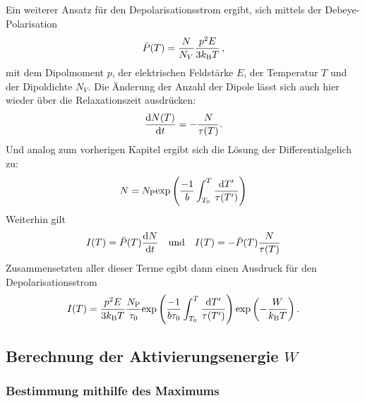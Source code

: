 		Ein weiterer Ansatz für den Depolarisationsstrom ergibt, sich mittels der Debeye-Polarisation
		\begin{equation}
			\bar{P}(T) = \frac{N}{N_V}\frac{p^2E}{3k_{\text{B}}T} \, ,
		\end{equation}	
		mit dem Dipolmoment $p$, der elektrischen Feldstärke $E$, der Temperatur $T$ und der Dipoldichte $N_V$.
		Die Änderung der Anzahl der Dipole lässt sich auch hier wieder über die Relaxationszeit ausdrücken:
		\begin{equation}
			\frac{\text{d} N(T)}{\text{d} t} =- \frac{N}{\tau(T)}.
		\end{equation}
		Und analog zum vorherigen Kapitel ergibt sich die Lösung der Differentialgelich zu:
		\begin{equation}
			N = N_{\text{P}} \text{exp}\left( \frac{-1}{b}\int_{T_0}^T \frac{\text{d}T'}{\tau(T')}\right)
		\end{equation}
		Weiterhin gilt
		\begin{align}
			I(T) = \bar{P}(T)\frac{\text{d} N}{\text{d} t}& &\text{und} & & I(T) = -\bar{P}(T) \frac{N}{\tau(T)}
		\end{align}
		Zusammensetzten aller dieser Terme egibt dann einen Ausdruck für den Depolarisationsstrom
		\begin{equation}
			I(T) =\frac{p^2E}{3k_{\text{B}}T}\frac{N_{\text{P}}}{\tau_0}\text{exp}\left(\frac{-1}{b\tau_0}\int_{T_0}^T\frac{\text{d}T'}{\tau(T')}\right)\text{exp}\left(-\frac{W}{k_{\text{B}}T}\right).
			\label{eqn:long}
		\end{equation}		

	\subsection{Berechnung der Aktivierungsenergie $W$}
		
		\subsubsection{Bestimmung mithilfe des Maximums}

